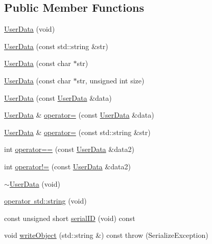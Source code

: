 \subsection*{Public Member Functions}
\begin{DoxyCompactItemize}
\item 
\mbox{\hyperlink{classFILEDB_1_1UserData_ab92cdcf29a782d8d731752d12f849919}{User\+Data}} (void)
\item 
\mbox{\hyperlink{classFILEDB_1_1UserData_a47d70a4d9bce994d9ec79e30642120f0}{User\+Data}} (const std\+::string \&str)
\item 
\mbox{\hyperlink{classFILEDB_1_1UserData_ad0aaf29e2f7dcd413f9dca937422aeec}{User\+Data}} (const char $\ast$str)
\item 
\mbox{\hyperlink{classFILEDB_1_1UserData_a69798b639088b04fe01c685485d8c695}{User\+Data}} (const char $\ast$str, unsigned int size)
\item 
\mbox{\hyperlink{classFILEDB_1_1UserData_af66756abed6a8abf8d1e32aa93b5db68}{User\+Data}} (const \mbox{\hyperlink{classFILEDB_1_1UserData}{User\+Data}} \&data)
\item 
\mbox{\hyperlink{classFILEDB_1_1UserData}{User\+Data}} \& \mbox{\hyperlink{classFILEDB_1_1UserData_a76e926353b2019d6b5a6333d3cc4c5b4}{operator=}} (const \mbox{\hyperlink{classFILEDB_1_1UserData}{User\+Data}} \&data)
\item 
\mbox{\hyperlink{classFILEDB_1_1UserData}{User\+Data}} \& \mbox{\hyperlink{classFILEDB_1_1UserData_ad8582ecfcd84204c1fa83d050cd2d8bd}{operator=}} (const std\+::string \&str)
\item 
int \mbox{\hyperlink{classFILEDB_1_1UserData_a1ba93b241613cfbecceabb9bf1040d2e}{operator==}} (const \mbox{\hyperlink{classFILEDB_1_1UserData}{User\+Data}} \&data2)
\item 
int \mbox{\hyperlink{classFILEDB_1_1UserData_acfdc12e0f4dbc6faebe8bf89856fee8d}{operator!=}} (const \mbox{\hyperlink{classFILEDB_1_1UserData}{User\+Data}} \&data2)
\item 
\mbox{\hyperlink{classFILEDB_1_1UserData_a1db23ff452703be8b538fc0c5a39cad2}{$\sim$\+User\+Data}} (void)
\item 
\mbox{\hyperlink{classFILEDB_1_1UserData_a5e54144b7f24d68684ddc85e036d0605}{operator std\+::string}} (void)
\item 
const unsigned short \mbox{\hyperlink{classFILEDB_1_1UserData_a2d1cee48b497ef3f25957ecb1464b7f5}{serial\+ID}} (void) const
\item 
void \mbox{\hyperlink{classFILEDB_1_1UserData_a42b5e25b3cba7274363590c5b6861795}{write\+Object}} (std\+::string \&) const  throw (\+Serialize\+Exception)

\end{DoxyCompactItemize}

